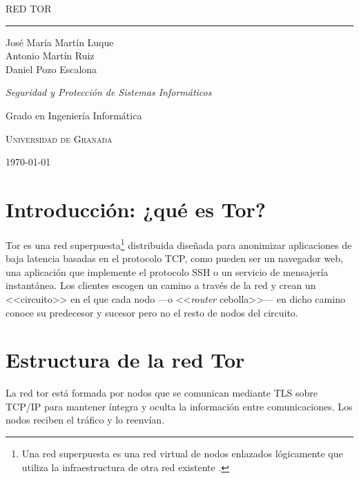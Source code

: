 \documentclass[
  a4paper,
  12pt,
  spanish,
]{scrartcl}
\DeclareRobustCommand{\spacedallcaps}[1]{{\linespread{1.3}\sacshape\MakeTextUppercase{#1}}}%
\newcommand{\horrule}[1]{\rule{\linewidth}{#1}}
\begin{document}
\begin{titlepage}
  \vspace*{4cm}

  \begin{flushleft}
    \Huge
    \spacedallcaps{Red Tor}
    \horrule{2pt}
  \end{flushleft}

  \vspace{2em}

  \begin{flushright}
    \large
    José María Martín Luque\\
    Antonio Martín Ruiz\\
    Daniel Pozo Escalona\vspace{1em}

    \textit{Seguridad y Protección de Sistemas Informáticos}

    Grado en Ingeniería Informática

    \textsc{Universidad de Granada}\vspace{1em}

    \today\vspace{.5em}
  \end{flushright}
\end{titlepage}

\newpage

{\hypersetup{hidelinks}
\tableofcontents
}

\newpage

\section{Introducción: ¿qué es Tor?}

Tor es una red superpuesta\footnote{
  Una red superpuesta es una red virtual de nodos enlazados lógicamente que utiliza la infraestructura de otra red existente \parencite[154]{kurose_computer_2013}.
} distribuida diseñada para anonimizar aplicaciones de baja latencia basadas en el protocolo TCP, como pueden ser un navegador web, una aplicación que implemente el protocolo SSH o un servicio de mensajería instantánea.
Los clientes escogen un camino a través de la red y crean un <<circuito>> en el que cada nodo ---o <<\textit{router} cebolla>>--- en dicho camino conoce su predecesor y sucesor pero no el resto de nodos del circuito.

\section{Estructura de la red Tor}
La red tor está formada por nodos que se comunican mediante TLS sobre TCP/IP para mantener íntegra y oculta la información entre comunicaciones. Los nodos reciben el tráfico y lo reenvían.
\end{document}
